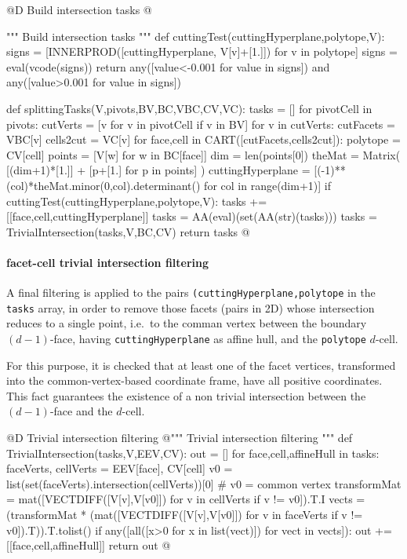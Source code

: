 \documentclass[11pt,oneside]{article}	%
\begin{document}
@D Build intersection tasks
@{""" Build intersection tasks """
def cuttingTest(cuttingHyperplane,polytope,V):
	signs = [INNERPROD([cuttingHyperplane, V[v]+[1.]]) for v in polytope]
	signs = eval(vcode(signs))
	return any([value<-0.001 for value in signs]) and any([value>0.001 for value in signs])

def splittingTasks(V,pivots,BV,BC,VBC,CV,VC):
	tasks = []
	for pivotCell in pivots:
		cutVerts = [v for v in pivotCell if v in BV]
		for v in cutVerts:
			cutFacets = VBC[v]
			cells2cut = VC[v]
			for face,cell in CART([cutFacets,cells2cut]):
				polytope = CV[cell]
				points = [V[w] for w in BC[face]]
				dim = len(points[0])
				theMat = Matrix( [(dim+1)*[1.]] + [p+[1.] for p in points] )
				cuttingHyperplane = [(-1)**(col)*theMat.minor(0,col).determinant() 
									for col in range(dim+1)]
				if cuttingTest(cuttingHyperplane,polytope,V):
					tasks += [[face,cell,cuttingHyperplane]]
	tasks = AA(eval)(set(AA(str)(tasks)))
	tasks = TrivialIntersection(tasks,V,BC,CV)
	return tasks
@}

\paragraph{facet-cell trivial intersection filtering}

A final filtering is applied to the pairs \texttt{(cutting\-Hyper\-plane,polytope} in the \texttt{tasks} array, in order to remove those facets (pairs in 2D) whose intersection reduces to a single point, i.e.~to the comman vertex between the boundary $(d-1)$-face, having \texttt{cuttingHyperplane} as affine hull, and the \texttt{polytope} $d$-cell.

For this purpose, it is checked that at least one of the facet vertices, transformed into the common-vertex-based coordinate frame, have all positive coordinates. This fact guarantees the existence of a non trivial intersection between the $(d-1)$-face and the $d$-cell.

@D Trivial intersection filtering
@{""" Trivial intersection filtering """
def TrivialIntersection(tasks,V,EEV,CV):
	out = []
	for face,cell,affineHull in tasks:
		faceVerts, cellVerts = EEV[face], CV[cell]
		v0 = list(set(faceVerts).intersection(cellVerts))[0] # v0 = common vertex
		transformMat = mat([VECTDIFF([V[v],V[v0]]) for v in cellVerts if v != v0]).T.I
		vects = (transformMat * (mat([VECTDIFF([V[v],V[v0]]) for v in faceVerts 
					if v != v0]).T)).T.tolist()
		if any([all([x>0 for x in list(vect)]) for vect in vects]): 
			out += [[face,cell,affineHull]]
	return out
@}
\end{document}

